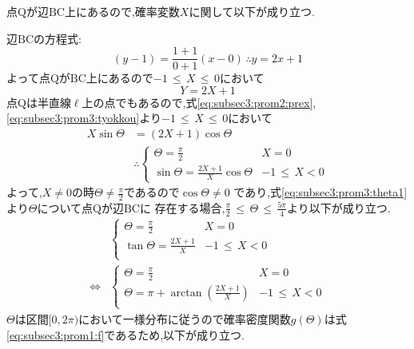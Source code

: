 \documentclass[dvipdfmx,titlepage, 11pt, a4paper]{jsarticle}%
\begin{document}
\begin{enumerate}[(1)]
  点$\mathrm{Q}$が辺$\mathrm{BC}$上にあるので,確率変数$X$に関して以下が成り立つ.
    
  辺$\mathrm{BC}$の方程式:
  \begin{equation*}
    (y - 1) = \frac{1 + 1}{0 + 1}(x - 0)\, \therefore y = 2x + 1
  \end{equation*}
  よって点$\mathrm{Q}$が$\mathrm{BC}$上にあるので$-1\, \leq\, X\, \leq\, 0$において
  \begin{equation}
    Y = 2X + 1\label{eq:subsec3:prom3:tyokkou}
  \end{equation}
  点$\mathrm{Q}$は半直線$\ell$上の点でもあるので,式\eqref{eq:subsec3:prom2:prex}, \eqref{eq:subsec3:prom3:tyokkou}より$-1\, \leq\, X\, \leq\, 0$において
  \begin{align}
    X\sin\Theta &= \left(2X + 1\right)\cos\Theta\nonumber\\
                &\therefore
                  \begin{cases}
                    \Theta = \frac{\pi}{2} & X = 0\\
                    \sin\Theta = \frac{2X + 1}{X}\cos\Theta & -1\, \leq\, X < 0
                  \end{cases}\label{eq:subsec3:prom3:theta1}
  \end{align}
  よって,$X \neq 0$の時$\Theta \neq \frac{\pi}{2}$であるので$\cos\Theta \neq 0$
  であり,式\eqref{eq:subsec3:prom3:theta1}より$\Theta$について点$\mathrm{Q}$が辺$\mathrm{BC}$に
  存在する場合,$\frac{\pi}{2} \, \leq\, \Theta\, \leq\, \frac{5\pi}{4}$より以下が成り立つ.
  \begin{align}
    &\begin{cases}
      \Theta = \frac{\pi}{2} & X = 0\\
      \tan\Theta = \frac{2X + 1}{X} & -1\, \leq\, X < 0\\
    \end{cases}\nonumber\\
    \Longleftrightarrow&
                         \begin{cases}
                           \Theta = \frac{\pi}{2} & X = 0\\
                           \Theta = \pi + \arctan\left(\frac{2X + 1}{X}\right) & -1\, \leq\, X < 0\\
                         \end{cases}\label{eq:subsec3:prom3:theta2}
  \end{align}
  $\Theta$は区間$[0, 2\pi)$において一様分布に従うので確率密度関数$g(\Theta)$は式
  \eqref{eq:subsec3:prom1:f}であるため,以下が成り立つ.

\end{enumerate}
\end{document}
